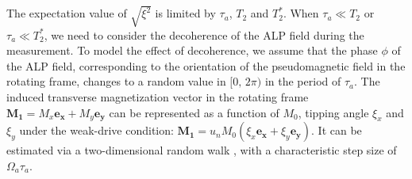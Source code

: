 The expectation value of $\sqrt{ \xi^2 }$ is limited by $\tau_a$, $T_2$ and $T_2^*$. 
When $\tau_a \ll T_2$ or $\tau_a \ll T_2^*$, we need to consider the decoherence of the ALP field during the measurement. 
To model the effect of decoherence, we assume that the phase $\phi$ of the ALP field, corresponding to the orientation of the pseudomagnetic field in the rotating frame, changes to a random value in $[0,\, 2\pi)$ in the period of $\tau_a$. The induced transverse magnetization vector in the rotating frame $\mathbf{M_1} = M_x\mathbf{e_x} + M_y\mathbf{e_y}$ can be represented as a function of $M_0$, tipping angle $\xi_x$ and $\xi_y$ under the weak-drive condition: $\mathbf{M_1} = u_n M_0 (\xi_x\mathbf{e_x} + \xi_y\mathbf{e_y})$. 
It can be estimated via a two-dimensional random walk \cite{Loudon2000TheQT}, with a characteristic step size of $\Omega_a\tau_a$. 
